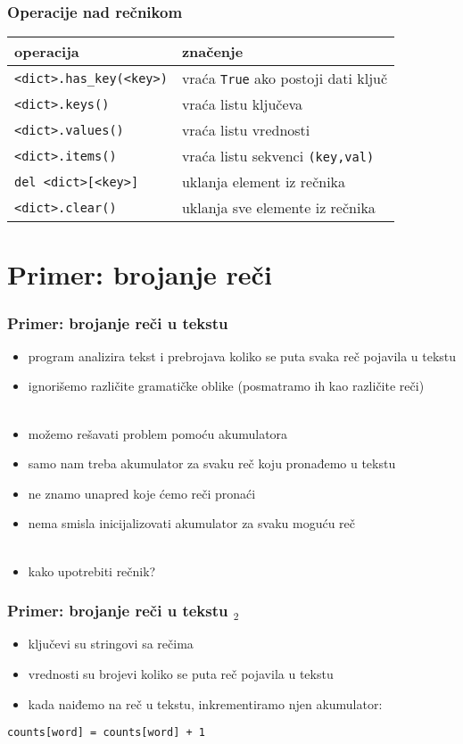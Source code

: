 \documentclass[utf8,compress,aspectratio=169]{beamer}
\begin{document}
\begin{frame}[fragile]
  \frametitle{Operacije nad rečnikom}
\begin{center}
\begin{tabular}{l|l}
\textbf{operacija} & \textbf{značenje} \\ \hline
\texttt{<dict>.has\_key(<key>)} & vraća \texttt{True} ako postoji dati ključ \\
\texttt{<dict>.keys()} & vraća listu ključeva \\
\texttt{<dict>.values()} & vraća listu vrednosti \\
\texttt{<dict>.items()} & vraća listu sekvenci \texttt{(key,val)} \\
\texttt{del <dict>[<key>]} & uklanja element iz rečnika \\
\texttt{<dict>.clear()} & uklanja sve elemente iz rečnika
\end{tabular}
\end{center}
\end{frame}

\section[Primer]{Primer: brojanje reči}

\begin{frame}[fragile]
  \frametitle{Primer: brojanje reči u tekstu}
  \begin{itemize}
    \item program analizira tekst i prebrojava koliko se puta svaka reč pojavila u tekstu
    \item ignorišemo različite gramatičke oblike (posmatramo ih kao različite reči) \\ \ \\
    \item možemo rešavati problem pomoću akumulatora
    \item samo nam treba akumulator za svaku reč koju pronađemo u tekstu
    \item ne znamo unapred koje ćemo reči pronaći
    \item nema smisla inicijalizovati akumulator za svaku moguću reč \\ \ \\
    \item kako upotrebiti rečnik?
  \end{itemize}
\end{frame}

\begin{frame}[fragile]
  \frametitle{Primer: brojanje reči u tekstu $_2$}
  \begin{itemize}
    \item ključevi su stringovi sa rečima
    \item vrednosti su brojevi koliko se puta reč pojavila u tekstu
    \item kada naiđemo na reč u tekstu, inkrementiramo njen akumulator:
  \end{itemize}
\begin{verbatim}
counts[word] = counts[word] + 1
\end{verbatim}
\end{frame}
\end{document}
